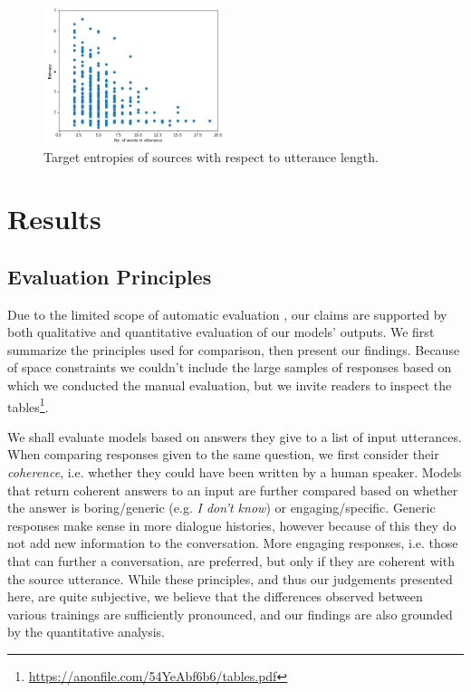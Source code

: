 \documentclass[11pt,a4paper]{article}
\begin{document}
\begin{figure}[!ht]
	\centering
	\includegraphics[width=0.47\textwidth]{pics/source_entropies_length.png}
	\caption{Target entropies of sources with respect to utterance length.}
	\label{fig:length}
\end{figure}

\section{Results}
\label{sec:results}
\subsection{Evaluation Principles}
\label{sec:eval}

Due to the limited scope of automatic evaluation
\cite{Liu:2016}, our claims are supported by both qualitative and quantitative evaluation of our models' outputs. We first summarize the principles used for
comparison, then present our findings. Because of space constraints we couldn't include the large samples of responses based on which we conducted the manual evaluation, but we invite readers to inspect the tables\footnote{\url{https://anonfile.com/54YeAbf6b6/tables.pdf}}.

We shall evaluate models based on answers they give to a list of input utterances.
When comparing responses given to the same question, we first consider
their \textit{coherence}, i.e. whether they could have been written by a
human speaker. Models that return coherent answers to an input
are further compared based on whether the answer is boring/generic (e.g.
\textit{I don't know}) or engaging/specific. 
Generic responses make sense in more dialogue histories, however because of this
they do not add new information to the
conversation. More engaging responses, i.e. those that can further a conversation,
are preferred, but only if they are coherent with the source utterance.
While these principles, and thus our judgements presented here, are quite subjective,
we believe that the differences observed between various trainings
are sufficiently pronounced, and our findings are also grounded by the quantitative analysis.
\end{document}
